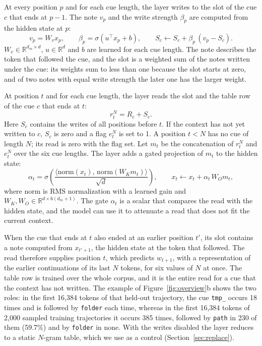 At every position $p$ and for each cue length, the layer writes to the slot of the cue $c$ that
ends at $p - 1$. The note $v_p$ and the write strength $\beta_p$ are computed from the hidden
state at $p$:
\begin{equation}
v_p = W_v x_p, \qquad \beta_p = \sigma(u^{\top} x_p + b), \qquad
S_c \leftarrow S_c + \beta_p\, (v_p - S_c) .
\label{eq:write}
\end{equation}
$W_v \in \mathbb{R}^{d_m \times d}$, $u \in \mathbb{R}^d$ and $b$ are learned for each cue length.
The note describes the token that followed the cue, and the slot is a weighted sum of the notes
written under the cue: its weights sum to less than one because the slot starts at zero, and of
two notes with equal write strength the later one has the larger weight.

At position $t$ and for each cue length, the layer reads the slot and the table row of the cue $c$
that ends at $t$:
\begin{equation}
r^N_t = R_c + S_c .
\label{eq:read}
\end{equation}
Here $S_c$ contains the writes of all positions before $t$. If the context has not yet written to
$c$, $S_c$ is zero and a flag $e^N_t$ is set to 1. A position $t < N$ has no cue of length $N$;
its read is zero with the flag set. Let $m_t$ be the concatenation of $r^N_t$ and
$e^N_t$ over the six cue lengths. The layer adds a gated projection of $m_t$ to the hidden state:
\begin{equation}
\alpha_t = \sigma\!\left( \frac{\langle \mathrm{norm}(x_t),\, \mathrm{norm}(W_K m_t) \rangle}{\sqrt{d}} \right),
\qquad x_t \leftarrow x_t + \alpha_t\, W_O m_t ,
\label{eq:gate}
\end{equation}
where $\mathrm{norm}$ is RMS normalization with a learned gain and $W_K, W_O \in \mathbb{R}^{d
\times 6(d_m + 1)}$. The gate $\alpha_t$ is a scalar that compares the read with the hidden state,
and the model can use it to attenuate a read that does not fit the current context.

When the cue that ends at $t$ also ended at an earlier position $t'$, its slot contains a note
computed from $x_{t'+1}$, the hidden state at the token that followed. The read therefore supplies
position $t$, which predicts $w_{t+1}$, with a representation of the earlier continuations of its
last $N$ tokens, for six values of $N$ at once. The table row is trained over the whole corpus,
and it is the entire read for a cue that the context has not written. The example of
Figure~\ref{fig:overview}b shows the two roles: in the first 16,384 tokens of that held-out
trajectory, the cue \texttt{tmp\_} occurs 18 times and is followed by \texttt{folder} each time,
whereas in the first 16,384 tokens of 2,000 sampled training trajectories it occurs 385 times,
followed by \texttt{path} in 230 of them (59.7\%) and by \texttt{folder} in none. With the writes disabled the
layer reduces to a static $N$-gram table, which we use as a control (Section~\ref{sec:replace}).

